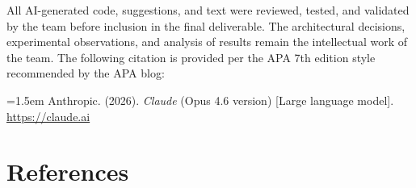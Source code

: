 \documentclass[12pt,a4paper]{article}
\begin{document}
All AI-generated code, suggestions, and text were reviewed, tested, and
validated by the team before inclusion in the final deliverable. The
architectural decisions, experimental observations, and analysis of results
remain the intellectual work of the team. The following citation is
provided per the APA 7th edition style recommended by the APA blog:

\vspace{0.5em}
\noindent
\hangindent=1.5em
Anthropic. (2026). \textit{Claude} (Opus 4.6 version) [Large language model]. \url{https://claude.ai}


\section*{References}
\end{document}
